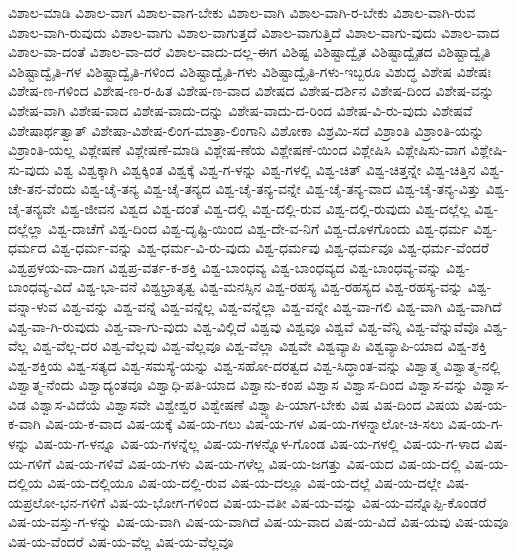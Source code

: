 {ವಿಶಾಲ-ಮಾಡಿ
ವಿಶಾಲ-ವಾಗ
ವಿಶಾಲ-ವಾಗ-ಬೇಕು
ವಿಶಾಲ-ವಾಗಿ
ವಿಶಾಲ-ವಾಗಿ-ರ-ಬೇಕು
ವಿಶಾಲ-ವಾಗಿ-ರುವ
ವಿಶಾಲ-ವಾಗಿ-ರುವುದು
ವಿಶಾಲ-ವಾಗು
ವಿಶಾಲ-ವಾಗುತ್ತದೆ
ವಿಶಾಲ-ವಾಗುತ್ತಿದೆ
ವಿಶಾಲ-ವಾಗು-ವುದು
ವಿಶಾಲ-ವಾದ
ವಿಶಾಲ-ವಾ-ದಂತೆ
ವಿಶಾಲ-ವಾ-ದರೆ
ವಿಶಾಲ-ವಾದು-ದಲ್ಲ-ಈಗ
ವಿಶಿಷ್ಟ
ವಿಶಿಷ್ಟಾದ್ವೈತ
ವಿಶಿಷ್ಟಾದ್ವೈತದ
ವಿಶಿಷ್ಟಾದ್ವೈತಿ
ವಿಶಿಷ್ಟಾದ್ವೈತಿ-ಗಳ
ವಿಶಿಷ್ಟಾದ್ವೈತಿ-ಗಳಿಂದ
ವಿಶಿಷ್ಟಾದ್ವೈತಿ-ಗಳು
ವಿಶಿಷ್ಟಾದ್ವೈತಿ-ಗಳು-ಇಬ್ಬರೂ
ವಿಶುದ್ಧ
ವಿಶೇಷ
ವಿಶೇಷಃ
ವಿಶೇಷ-ಣ-ಗಳಿಂದ
ವಿಶೇಷ-ಣ-ರ-ಹಿತ
ವಿಶೇಷ-ಣ-ವಾದ
ವಿಶೇಷದ
ವಿಶೇಷ-ದರ್ಶಿನ
ವಿಶೇಷ-ದಿಂದ
ವಿಶೇಷ-ವನ್ನು
ವಿಶೇಷ-ವಾಗಿ
ವಿಶೇಷ-ವಾದ
ವಿಶೇಷ-ವಾದು-ದನ್ನು
ವಿಶೇಷ-ವಾದು-ದ-ರಿಂದ
ವಿಶೇಷ-ವಿ-ರು-ವುದು
ವಿಶೇಷವೆ
ವಿಶೇಷಾರ್ಥತ್ವಾತ್
ವಿಶೇಷಾ-ವಿಶೇಷ-ಲಿಂಗ-ಮಾತ್ರಾ-ಲಿಂಗಾನಿ
ವಿಶೋಕಾ
ವಿಶ್ರಮಿ-ಸದೆ
ವಿಶ್ರಾಂತಿ
ವಿಶ್ರಾಂತಿ-ಯನ್ನು
ವಿಶ್ರಾಂತಿ-ಯಲ್ಲ
ವಿಶ್ಲೇಷಣೆ
ವಿಶ್ಲೇಷಣೆ-ಮಾಡಿ
ವಿಶ್ಲೇಷ-ಣೆಯ
ವಿಶ್ಲೇಷಣೆ-ಯಿಂದ
ವಿಶ್ಲೇಷಿಸಿ
ವಿಶ್ಲೇಷಿಸು-ವಾಗ
ವಿಶ್ಲೇಷಿ-ಸು-ವುದು
ವಿಶ್ವ
ವಿಶ್ವಕ್ಕಾಗಿ
ವಿಶ್ವಕ್ಕಿಂತ
ವಿಶ್ವಕ್ಕೆ
ವಿಶ್ವ-ಗ-ಳನ್ನು
ವಿಶ್ವ-ಗಳಲ್ಲಿ
ವಿಶ್ವ-ಚಿತ್
ವಿಶ್ವ-ಚಿತ್ತನ್ನೇ
ವಿಶ್ವ-ಚಿತ್ತಿನ
ವಿಶ್ವ-ಚೇ-ತನ-ವೆಂದು
ವಿಶ್ವ-ಚೈ-ತನ್ಯ
ವಿಶ್ವ-ಚೈ-ತನ್ಯದ
ವಿಶ್ವ-ಚೈ-ತನ್ಯ-ವನ್ನೇ
ವಿಶ್ವ-ಚೈ-ತನ್ಯ-ವಾದ
ವಿಶ್ವ-ಚೈ-ತನ್ಯ-ವಿತ್ತು
ವಿಶ್ವ-ಚೈ-ತನ್ಯವೇ
ವಿಶ್ವ-ಜೀವನ
ವಿಶ್ವದ
ವಿಶ್ವ-ದಂತೆ
ವಿಶ್ವ-ದಲ್ಲಿ
ವಿಶ್ವ-ದಲ್ಲಿ-ರುವ
ವಿಶ್ವ-ದಲ್ಲಿ-ರುವುದು
ವಿಶ್ವ-ದಲ್ಲೆಲ್ಲ
ವಿಶ್ವ-ದಲ್ಲೆಲ್ಲಾ
ವಿಶ್ವ-ದಾಚೆಗೆ
ವಿಶ್ವ-ದಿಂದ
ವಿಶ್ವ-ದೃಷ್ಟಿ-ಯಿಂದ
ವಿಶ್ವ-ದೇ-ವ-ನಿಗೆ
ವಿಶ್ವ-ದೊಳಗೊಂದು
ವಿಶ್ವ-ಧರ್ಮ
ವಿಶ್ವ-ಧರ್ಮದ
ವಿಶ್ವ-ಧರ್ಮ-ವನ್ನು
ವಿಶ್ವ-ಧರ್ಮ-ವಿ-ರು-ವುದು
ವಿಶ್ವ-ಧರ್ಮವು
ವಿಶ್ವ-ಧರ್ಮವೂ
ವಿಶ್ವ-ಧರ್ಮ-ವೆಂದರೆ
ವಿಶ್ವಪ್ರಳಯ-ವಾ-ದಾಗ
ವಿಶ್ವಪ್ರ-ವರ್ತ-ಕ-ಶಕ್ತಿ
ವಿಶ್ವ-ಬಾಂಧವ್ಯ
ವಿಶ್ವ-ಬಾಂಧವ್ಯದ
ವಿಶ್ವ-ಬಾಂಧವ್ಯ-ವನ್ನು
ವಿಶ್ವ-ಬಾಂಧವ್ಯ-ವಿದೆ
ವಿಶ್ವ-ಭಾ-ವನೆ
ವಿಶ್ವಭ್ರಾತೃತ್ವ
ವಿಶ್ವ-ಮನಸ್ಸಿನ
ವಿಶ್ವ-ರಹಸ್ಯ
ವಿಶ್ವ-ರಹಸ್ಯದ
ವಿಶ್ವ-ರಹಸ್ಯ-ವನ್ನು
ವಿಶ್ವ-ವನ್ನಾ-ಳುವ
ವಿಶ್ವ-ವನ್ನು
ವಿಶ್ವ-ವನ್ನೆ
ವಿಶ್ವ-ವನ್ನೆಲ್ಲ
ವಿಶ್ವ-ವನ್ನೆಲ್ಲಾ
ವಿಶ್ವ-ವನ್ನೇ
ವಿಶ್ವ-ವಾ-ಗಲಿ
ವಿಶ್ವ-ವಾಗಿ
ವಿಶ್ವ-ವಾಗಿದೆ
ವಿಶ್ವ-ವಾ-ಗಿ-ರುವುದು
ವಿಶ್ವ-ವಾ-ಗು-ವುದು
ವಿಶ್ವ-ವಿಲ್ಲಿದೆ
ವಿಶ್ವವು
ವಿಶ್ವವೂ
ವಿಶ್ವವೆ
ವಿಶ್ವ-ವೆನ್ನಿ
ವಿಶ್ವ-ವೆನ್ನುವೆವೊ
ವಿಶ್ವ-ವೆಲ್ಲ
ವಿಶ್ವ-ವೆಲ್ಲ-ದರ
ವಿಶ್ವ-ವೆಲ್ಲವು
ವಿಶ್ವ-ವೆಲ್ಲವೂ
ವಿಶ್ವ-ವೆಲ್ಲಾ
ವಿಶ್ವವೇ
ವಿಶ್ವವ್ಯಾಪಿ
ವಿಶ್ವವ್ಯಾಪಿ-ಯಾದ
ವಿಶ್ವ-ಶಕ್ತಿ
ವಿಶ್ವ-ಶಕ್ತಿಯ
ವಿಶ್ವ-ಸತ್ಯದ
ವಿಶ್ವ-ಸಮಸ್ಯೆ-ಯನ್ನು
ವಿಶ್ವ-ಸಹೋ-ದರತ್ವದ
ವಿಶ್ವ-ಸಿದ್ಧಾಂತ-ವನ್ನು
ವಿಶ್ವಾತ್ಮ
ವಿಶ್ವಾತ್ಮ-ನಲ್ಲಿ
ವಿಶ್ವಾತ್ಮ-ನೆಂದು
ವಿಶ್ವಾದ್ಯಂತವೂ
ವಿಶ್ವಾಧಿ-ಪತಿ-ಯಾದ
ವಿಶ್ವಾನು-ಕಂಪ
ವಿಶ್ವಾಸ
ವಿಶ್ವಾಸ-ದಿಂದ
ವಿಶ್ವಾಸ-ವನ್ನು
ವಿಶ್ವಾಸ-ವಿಡ
ವಿಶ್ವಾಸ-ವಿದೆಯೆ
ವಿಶ್ವಾಸವೇ
ವಿಶ್ವೇಶ್ವರ
ವಿಶ್ವೇಷಣೆ
ವಿಶ್ವ್ಯಾಪಿ-ಯಾಗ-ಬೇಕು
ವಿಷ
ವಿಷ-ದಿಂದ
ವಿಷಯ
ವಿಷ-ಯ-ಕ-ವಾಗಿ
ವಿಷ-ಯ-ಕ-ವಾದ
ವಿಷ-ಯಕ್ಕೆ
ವಿಷ-ಯ-ಗಲು
ವಿಷ-ಯ-ಗಳ
ವಿಷ-ಯ-ಗಳನ್ನಾಲೋ-ಚಿ-ಸಲು
ವಿಷ-ಯ-ಗ-ಳನ್ನು
ವಿಷ-ಯ-ಗ-ಳನ್ನೂ
ವಿಷ-ಯ-ಗಳನ್ನೆಲ್ಲ
ವಿಷ-ಯ-ಗಳನ್ನೊಳ-ಗೊಂಡ
ವಿಷ-ಯ-ಗಳಲ್ಲಿ
ವಿಷ-ಯ-ಗ-ಳಾದ
ವಿಷ-ಯ-ಗಳಿಗೆ
ವಿಷ-ಯ-ಗಳಿವೆ
ವಿಷ-ಯ-ಗಳು
ವಿಷ-ಯ-ಗಳೆಲ್ಲ
ವಿಷ-ಯ-ಜಗತ್ತು
ವಿಷ-ಯದ
ವಿಷ-ಯ-ದಲ್ಲಿ
ವಿಷ-ಯ-ದಲ್ಲಿಯ
ವಿಷ-ಯ-ದಲ್ಲಿಯೂ
ವಿಷ-ಯ-ದಲ್ಲಿ-ರುವ
ವಿಷ-ಯ-ದಲ್ಲೂ
ವಿಷ-ಯ-ದಲ್ಲೆ
ವಿಷ-ಯ-ದಲ್ಲೇ
ವಿಷ-ಯಪ್ರಲೋ-ಭನ-ಗಳಿಗೆ
ವಿಷ-ಯ-ಭೋಗ-ಗಳಿಂದ
ವಿಷ-ಯ-ವತೀ
ವಿಷ-ಯ-ವನ್ನು
ವಿಷ-ಯ-ವನ್ನೊಪ್ಪಿ-ಕೊಂಡರೆ
ವಿಷ-ಯ-ವಸ್ತು-ಗ-ಳನ್ನು
ವಿಷ-ಯ-ವಾಗಿ
ವಿಷ-ಯ-ವಾಗಿದೆ
ವಿಷ-ಯ-ವಾದ
ವಿಷ-ಯ-ವಿದೆ
ವಿಷ-ಯವು
ವಿಷ-ಯವೂ
ವಿಷ-ಯ-ವೆಂದರೆ
ವಿಷ-ಯ-ವೆಲ್ಲ
ವಿಷ-ಯ-ವೆಲ್ಲವೂ
}
